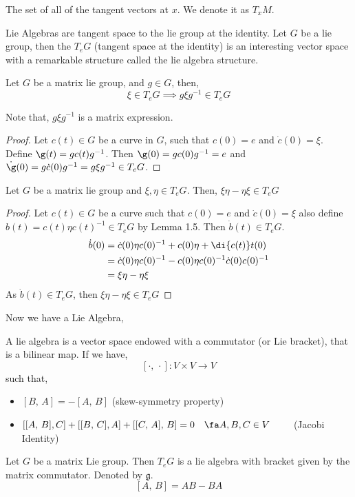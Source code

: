 \begin{ndefi}
  The set of all of the tangent vectors at $x$. We denote it as $T_x M$.
\end{ndefi}


Lie Algebras are tangent space to the lie group at the identity. Let $G$ be a lie group, then the $T_e G$ (tangent space at the identity) is an interesting vector space with a remarkable structure called the lie algebra structure.

\begin{nlemma}
  Let $G$ be a matrix lie group, and $g \in G$, then,
  $$ \xi \in T_eG \implies g\xi g^{-1} \in T_eG $$
\end{nlemma}
Note that, $g \xi g^{-1}$ is a matrix expression.\\

\begin{proof}
  Let $c(t) \in G$ be a curve in $G$, such that $c(0) = e$ and $\dot c (0) = \xi$. Define $\g (t) = gc(t)g^{-1}$. Then $\g(0) = g c(0) g^{-1} = e$ and $\dot\g (0) = g \dot c (0) g^{-1} = g\xi g^{-1} \in T_e G$.
\end{proof}

\begin{nprop}
  Let $G$ be a matrix lie group and $\xi, \eta \in T_eG$. Then, $\xi\eta - \eta\xi \in T_eG$
\end{nprop}
\begin{proof}
  Let $c(t) \in G$ be a curve such that $c(0) = e$ and $\dot c(0) = \xi$ also define $b(t) = c(t)\eta c(t)^{-1} \in T_eG$ by Lemma 1.5. Then $\dot b(t) \in T_eG$.
  \begin{align*}
    \dot b(0) &= \dot c(0)\eta c(0)^{-1} + c(0)\eta + \di {c(t)} t (0)\\
    &= \dot c(0)\eta c(0)^{-1} - c(0)\eta c(0)^{-1}\dot c(0) c(0)^{-1}\\
    &= \xi \eta - \eta\xi
  \end{align*}
  As $\dot b(t) \in T_eG$, then $\xi \eta - \eta\xi \in T_eG$
\end{proof}

Now we have a Lie Algebra,
\begin{ndefi}
  A lie algebra is a vector space endowed with a {\color{blue} commutator }(or Lie bracket), that is a bilinear map. If we have,
  $$ [\cdot,\, \cdot] : V \times V \to V $$
  such that,
  \begin{itemize}
    \item $[B,\, A] = - [A,\, B]$ (skew-symmetry property)
    \item $[[A,\, B], C] + [[B,\, C], A] + [[C,\, A],\, B] = 0 \quad \fa A, B, C \in V \qquad$ (Jacobi Identity)
  \end{itemize}
\end{ndefi}

\begin{nthm}
  Let $G$ be a matrix Lie group. Then $T_eG$ is a lie algebra with bracket given by the matrix commutator. Denoted by $\mathfrak{g}$.
  $$ [A,\, B] = AB - BA $$
\end{nthm}

